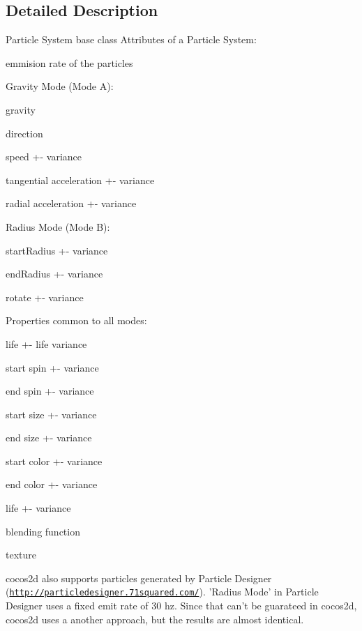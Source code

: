 \subsection{Detailed Description}
Particle System base class Attributes of a Particle System\-:
\begin{DoxyItemize}
\item emmision rate of the particles
\item Gravity Mode (Mode A)\-:
\begin{DoxyItemize}
\item gravity
\item direction
\item speed +-\/ variance
\item tangential acceleration +-\/ variance
\item radial acceleration +-\/ variance
\end{DoxyItemize}
\item Radius Mode (Mode B)\-:
\begin{DoxyItemize}
\item start\-Radius +-\/ variance
\item end\-Radius +-\/ variance
\item rotate +-\/ variance
\end{DoxyItemize}
\item Properties common to all modes\-:
\begin{DoxyItemize}
\item life +-\/ life variance
\item start spin +-\/ variance
\item end spin +-\/ variance
\item start size +-\/ variance
\item end size +-\/ variance
\item start color +-\/ variance
\item end color +-\/ variance
\item life +-\/ variance
\item blending function
\end{DoxyItemize}
\item texture
\end{DoxyItemize}

cocos2d also supports particles generated by Particle Designer (\href{http://particledesigner.71squared.com/}{\tt http\-://particledesigner.\-71squared.\-com/}). 'Radius Mode' in Particle Designer uses a fixed emit rate of 30 hz. Since that can't be guarateed in cocos2d, cocos2d uses a another approach, but the results are almost identical.

